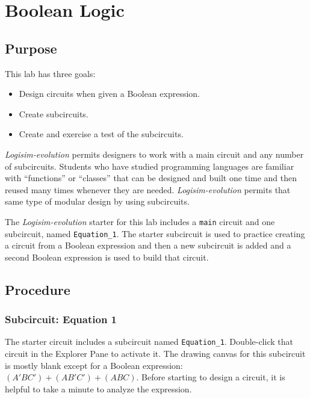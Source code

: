\chapter{Boolean Logic}

\section{Purpose}

This lab has three goals: 

\begin{itemize}
	\item Design circuits when given a Boolean expression.
	\item Create subcircuits.
	\item Create and exercise a test of the subcircuits.
\end{itemize}

\textit{Logisim-evolution} permits designers to work with a main circuit and any number of subcircuits. Students who have studied programming languages are familiar with ``functions'' or ``classes'' that can be designed and built one time and then reused many times whenever they are needed. \textit{Logisim-evolution} permits that same type of modular design by using subcircuits. 

The \textit{Logisim-evolution} starter for this lab includes a \lstinline[columns=fixed]|main| circuit and one subcircuit, named \lstinline[columns=fixed]|Equation_1|. The starter subcircuit is used to practice creating a circuit from a Boolean expression and then a new subcircuit is added and a second Boolean expression is used to build that circuit.

\section{Procedure}

\subsection{Subcircuit: Equation 1}

The starter circuit includes a subcircuit named \lstinline[columns=fixed]|Equation_1|. Double-click that circuit in the Explorer Pane to activate it. The drawing canvas for this subcircuit is mostly blank except for a Boolean expression: $ (A'BC')+(AB'C')+(ABC) $. Before starting to design a circuit, it is helpful to take a minute to analyze the expression. 

